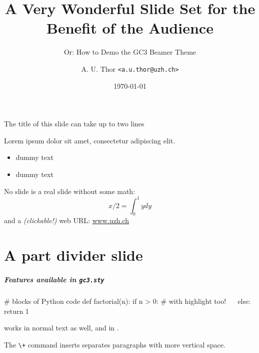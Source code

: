 \documentclass[english,serif,mathserif,usenames,dvipsnames]{beamer}
\begin{document}
\title[A Wonderful Slide Set]{A Very Wonderful Slide Set for the Benefit of the Audience}
\subtitle{Or: How to Demo the GC3 Beamer Theme}
\author{A. U. Thor \texttt{<a.u.thor@uzh.ch>}}
\date{\today}

\maketitle


\begin{frame}{The title of this slide can take up to two lines}

  Lorem ipsum dolor sit amet, consectetur adipiscing elit.
  \begin{itemize}
  \item dummy text
  \item dummy text
  \end{itemize}

  No slide is a real slide without some math:
  $$x/2 = \int_{0}^{1} ydy$$
  and a \emph{(clickable!)} web URL: \url{www.uzh.ch}

\end{frame}

\part{A part divider slide}

\begin{frame}
  \frametitle{Features available in \texttt{gc3.sty}}

  \begin{python}
# blocks of Python code
def factorial(n):
  if n > 0:
    # with highlight too!
    ~~
  else:
    return 1
  \end{python}

  \+
   works in normal text as well, and
  in  .

  \+
  The \lstinline|\+| command inserts separates paragraphs with more
  vertical space.
\end{frame}
\end{document}
